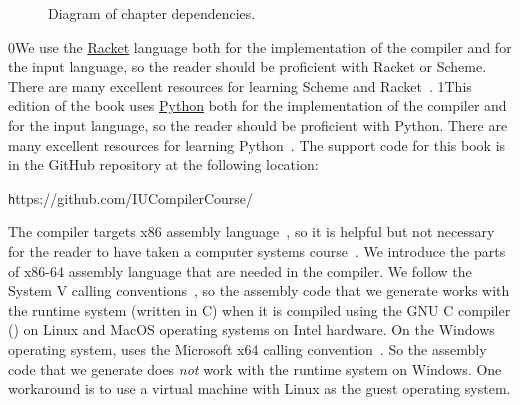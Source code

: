 \documentclass[7x10]{TimesAPriori_MIT}%
\def\racketEd{0}
\def\pythonEd{1}
\def\edition{1}
\newcommand{\racket}[1]{{\if\edition\racketEd{#1}\fi}}
\newcommand{\pythonColor}[0]{}
\newcommand{\python}[1]{{\if\edition\pythonEd\pythonColor #1\fi}}
\numberwithin{theorem}{chapter}
\numberwithin{definition}{chapter}
\numberwithin{equation}{chapter}
\begin{document}
\begin{figure}[tp]
\begin{tcolorbox}[colback=white]
{
\fi}
\end{tcolorbox}
\caption{Diagram of chapter dependencies.}
\label{fig:chapter-dependences}
\end{figure}

\racket{We use the \href{https://racket-lang.org/}{Racket} language both for
the implementation of the compiler and for the input language, so the
reader should be proficient with Racket or Scheme. There are many
excellent resources for learning Scheme and
Racket~\citep{Dybvig:1987aa,Abelson:1996uq,Friedman:1996aa,Felleisen:2001aa,Felleisen:2013aa,Flatt:2014aa}.}
%
\python{This edition of the book uses \href{https://www.python.org/}{Python}
both for the implementation of the compiler and for the input language, so the
reader should be proficient with Python. There are many
excellent resources for learning Python~\citep{Lutz:2013vp,Barry:2016vj,Sweigart:2019vn,Matthes:2019vs}.}%
%
The support code for this book is in the GitHub repository at
the following location:
\begin{center}\small\texttt
  https://github.com/IUCompilerCourse/
\end{center}

The compiler targets x86 assembly language~\citep{Intel:2015aa}, so it
is helpful but not necessary for the reader to have taken a computer
systems course~\citep{Bryant:2010aa}. We introduce the parts of x86-64
assembly language that are needed in the compiler.
%
We follow the System V calling
conventions~\citep{Bryant:2005aa,Matz:2013aa}, so the assembly code
that we generate works with the runtime system (written in C) when it
is compiled using the GNU C compiler () on Linux and MacOS
operating systems on Intel hardware.
%
On the Windows operating system,  uses the Microsoft x64
calling convention~\citep{Microsoft:2018aa,Microsoft:2020aa}. So the
assembly code that we generate does \emph{not} work with the runtime
system on Windows. One workaround is to use a virtual machine with
Linux as the guest operating system.
\end{document}
